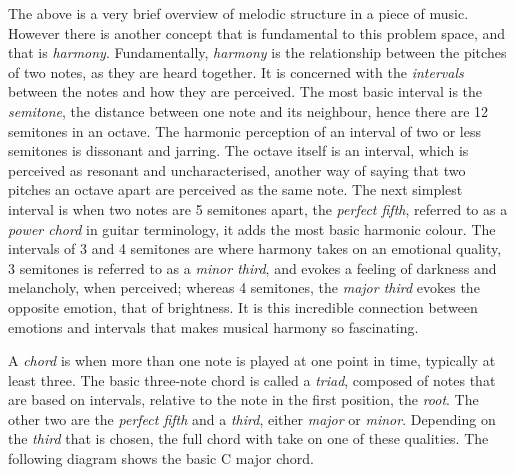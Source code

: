 \documentclass[bsc,singlespacing,logo, parskip, deptreport]{infthesis}
\begin{document}
The above is a very brief overview of melodic structure in a piece of music. However there is another concept that is fundamental to this problem space, and that is {\em harmony}. Fundamentally, {\em harmony} is the relationship between the pitches of two notes, as they are heard together. It is concerned with the {\em intervals} between the notes and how they are perceived. The most basic interval is the {\em semitone}, the distance between one note and its neighbour, hence there are 12 semitones in an octave. The harmonic perception of an interval of two or less semitones is dissonant and jarring. The octave itself is an interval, which is perceived as resonant and uncharacterised, another way of saying that two pitches an octave apart are perceived as the same note. The next simplest interval is when two notes are 5 semitones apart, the {\em perfect fifth}, referred to as a {\em power chord} in guitar terminology, it adds the most basic harmonic colour. The intervals of 3 and 4 semitones are where harmony takes on an emotional quality, 3 semitones is referred to as a {\em minor third}, and evokes a feeling of darkness and melancholy, when perceived; whereas 4 semitones, the {\em major third} evokes the opposite emotion, that of brightness. It is this incredible connection between emotions and intervals that makes musical harmony so fascinating.

\begin{center}
\end{center}

A {\em chord} is when more than one note is played at one point in time, typically at least three. The basic three-note chord is called a {\em triad}, composed of notes that are based on intervals, relative to the note in the first position, the {\em root}. The other two are the {\em perfect fifth} and a {\em third}, either {\em major} or {\em minor}. Depending on the {\em third} that is chosen, the full chord with take on one of these qualities. The following diagram shows the basic C major chord.

\begin{center}
\end{center}
\end{document}
